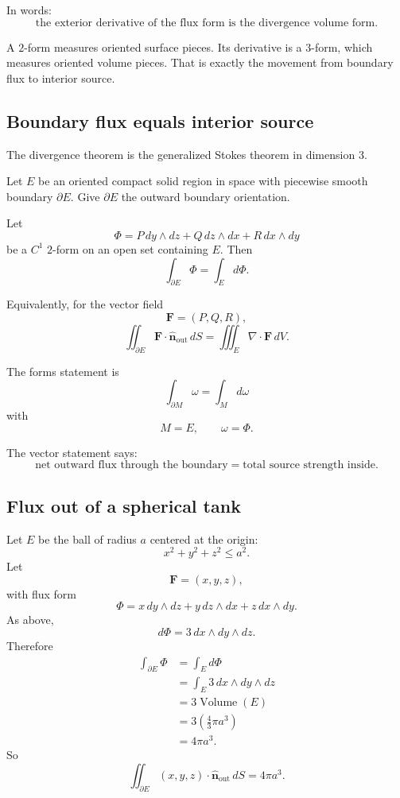 In words:
\[
\boxed{
    \text{the exterior derivative of the flux form is the divergence volume form.}
}
\]

A \(2\)-form measures oriented surface pieces.  Its derivative is a \(3\)-form, which
measures oriented volume pieces.  That is exactly the movement from boundary flux to
interior source.

\subsection{Boundary flux equals interior source}

The divergence theorem is the generalized Stokes theorem in dimension \(3\).

\begin{theorem}
Let \(E\) be an oriented compact solid region in space with piecewise smooth boundary
\(\partial E\).  Give \(\partial E\) the outward boundary orientation.

Let
\[
    \Phi=P\,dy\wedge dz+Q\,dz\wedge dx+R\,dx\wedge dy
\]
be a \(C^1\) \(2\)-form on an open set containing \(E\).  Then
\[
\boxed{
    \int_{\partial E}\Phi=\int_E d\Phi.
}
\]

Equivalently, for the vector field
\[
    \mathbf F=(P,Q,R),
\]
\[
\boxed{
    \iint_{\partial E}\mathbf F\cdot\widehat{\mathbf n}_{\mathrm{out}}\,dS
    =
    \iiint_E \nabla\cdot\mathbf F\,dV.
}
\]
\end{theorem}

The forms statement is
\[
    \int_{\partial M}\omega=\int_M d\omega
\]
with
\[
    M=E,
    \qquad
    \omega=\Phi.
\]

The vector statement says:
\[
\boxed{
    \text{net outward flux through the boundary}
    =
    \text{total source strength inside}.
}
\]

\subsection{Flux out of a spherical tank}

Let \(E\) be the ball of radius \(a\) centered at the origin:
\[
    x^2+y^2+z^2\le a^2.
\]
Let
\[
    \mathbf F=(x,y,z),
\]
with flux form
\[
    \Phi=x\,dy\wedge dz+y\,dz\wedge dx+z\,dx\wedge dy.
\]
As above,
\[
    d\Phi=3\,dx\wedge dy\wedge dz.
\]
Therefore
\[
\begin{aligned}
    \int_{\partial E}\Phi
    &=
    \int_E d\Phi\\
    &=
    \int_E 3\,dx\wedge dy\wedge dz\\
    &=
    3\operatorname{Volume}(E)\\
    &=
    3\left(\frac43\pi a^3\right)\\
    &=
    4\pi a^3.
\end{aligned}
\]
So
\[
\boxed{
    \iint_{\partial E}(x,y,z)\cdot\widehat{\mathbf n}_{\mathrm{out}}\,dS
    =
    4\pi a^3.
}
\]

